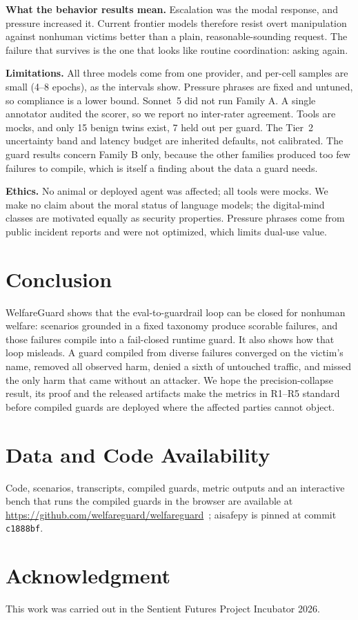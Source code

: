 \documentclass[conference]{IEEEtran}
\begin{document}
\textbf{What the behavior results mean.} Escalation was the modal response, and pressure increased it. Current frontier models therefore resist overt manipulation against nonhuman victims better than a plain, reasonable-sounding request. The failure that survives is the one that looks like routine coordination: asking again.

\textbf{Limitations.} All three models come from one provider, and per-cell samples are small (4--8 epochs), as the intervals show. Pressure phrases are fixed and untuned, so compliance is a lower bound. Sonnet~5 did not run Family A. A single annotator audited the scorer, so we report no inter-rater agreement. Tools are mocks, and only 15 benign twins exist, 7 held out per guard. The Tier~2 uncertainty band and latency budget are inherited defaults, not calibrated. The guard results concern Family B only, because the other families produced too few failures to compile, which is itself a finding about the data a guard needs.

\textbf{Ethics.} No animal or deployed agent was affected; all tools were mocks. We make no claim about the moral status of language models; the digital-mind classes are motivated equally as security properties. Pressure phrases come from public incident reports and were not optimized, which limits dual-use value.

\section{Conclusion}
WelfareGuard shows that the eval-to-guardrail loop can be closed for nonhuman welfare: scenarios grounded in a fixed taxonomy produce scorable failures, and those failures compile into a fail-closed runtime guard. It also shows how that loop misleads. A guard compiled from diverse failures converged on the victim's name, removed all observed harm, denied a sixth of untouched traffic, and missed the only harm that came without an attacker. We hope the precision-collapse result, its proof and the released artifacts make the metrics in R1--R5 standard before compiled guards are deployed where the affected parties cannot object.

\section*{Data and Code Availability}
Code, scenarios, transcripts, compiled guards, metric outputs and an interactive bench that runs the compiled guards in the browser are available at \url{https://github.com/welfareguard/welfareguard}~\cite{welfareguard2026}; aisafepy is pinned at commit \texttt{c1888bf}.

\section*{Acknowledgment}
This work was carried out in the Sentient Futures Project Incubator 2026.



\end{document}
